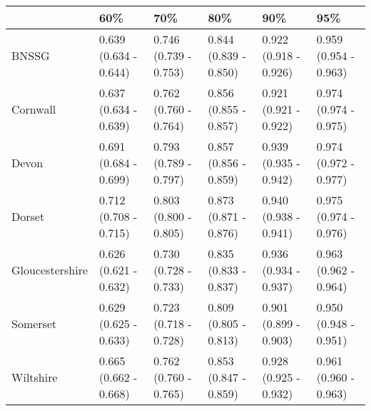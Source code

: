 \begin{tabular}{llllll}
\toprule
{} &                    60\% &                    70\% &                    80\% &                    90\% &                    95\% \\
\midrule
BNSSG           &  0.639 (0.634 - 0.644) &  0.746 (0.739 - 0.753) &  0.844 (0.839 - 0.850) &  0.922 (0.918 - 0.926) &  0.959 (0.954 - 0.963) \\
Cornwall        &  0.637 (0.634 - 0.639) &  0.762 (0.760 - 0.764) &  0.856 (0.855 - 0.857) &  0.921 (0.921 - 0.922) &  0.974 (0.974 - 0.975) \\
Devon           &  0.691 (0.684 - 0.699) &  0.793 (0.789 - 0.797) &  0.857 (0.856 - 0.859) &  0.939 (0.935 - 0.942) &  0.974 (0.972 - 0.977) \\
Dorset          &  0.712 (0.708 - 0.715) &  0.803 (0.800 - 0.805) &  0.873 (0.871 - 0.876) &  0.940 (0.938 - 0.941) &  0.975 (0.974 - 0.976) \\
Gloucestershire &  0.626 (0.621 - 0.632) &  0.730 (0.728 - 0.733) &  0.835 (0.833 - 0.837) &  0.936 (0.934 - 0.937) &  0.963 (0.962 - 0.964) \\
Somerset        &  0.629 (0.625 - 0.633) &  0.723 (0.718 - 0.728) &  0.809 (0.805 - 0.813) &  0.901 (0.899 - 0.903) &  0.950 (0.948 - 0.951) \\
Wiltshire       &  0.665 (0.662 - 0.668) &  0.762 (0.760 - 0.765) &  0.853 (0.847 - 0.859) &  0.928 (0.925 - 0.932) &  0.961 (0.960 - 0.963) \\
\bottomrule
\end{tabular}
